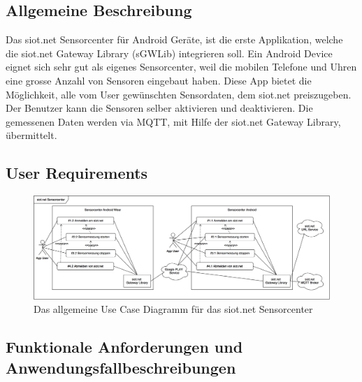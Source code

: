 \subsection{Allgemeine Beschreibung}
Das siot.net Sensorcenter für Android Geräte, ist die erste Applikation, welche die siot.net Gateway Library (\gls{sGWLib}) integrieren soll. Ein Android Device eignet sich sehr gut als eigenes Sensorcenter, weil die mobilen Telefone und Uhren eine grosse Anzahl von Sensoren eingebaut haben. Diese App bietet die Möglichkeit, alle vom User gewünschten Sensordaten, dem siot.net preiszugeben. Der Benutzer kann die Sensoren selber aktivieren und deaktivieren. Die gemessenen Daten werden via \gls{MQTT}, mit Hilfe der siot.net Gateway Library, übermittelt.
\subsection{User Requirements}
\begin{figure}[h]
  \centering
  \includegraphics[scale=0.21]{98_Bilder/08_Requirements/UseCaseSensorcenter}
  \caption[Use Case siot.net Sensorcenter]{Das allgemeine Use Case Diagramm für das siot.net Sensorcenter}
\end{figure}
\newpage
\subsection{Funktionale Anforderungen und Anwendungsfallbeschreibungen}
